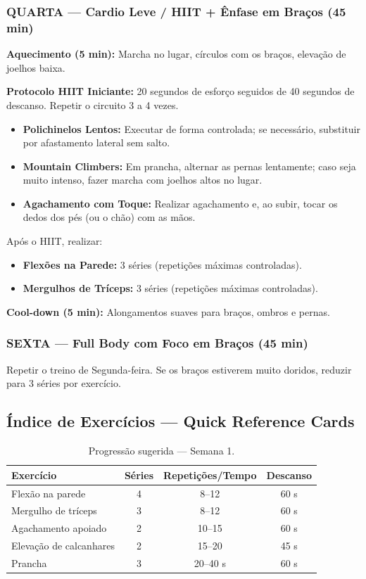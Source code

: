 \documentclass[12pt,a4paper]{scrartcl}
\begin{document}
\subsubsection{QUARTA — Cardio Leve / HIIT + Ênfase em Braços (45 min)}
\textbf{Aquecimento (5 min):} Marcha no lugar, círculos com os braços, elevação de joelhos baixa.

\textbf{Protocolo HIIT Iniciante:} 20 segundos de esforço seguidos de 40 segundos de descanso. Repetir o circuito 3 a 4 vezes.

\begin{itemize}
    \item \textbf{Polichinelos Lentos:} Executar de forma controlada; se necessário, substituir por afastamento lateral sem salto.
    \item \textbf{Mountain Climbers:} Em prancha, alternar as pernas lentamente; caso seja muito intenso, fazer marcha com joelhos altos no lugar.
    \item \textbf{Agachamento com Toque:} Realizar agachamento e, ao subir, tocar os dedos dos pés (ou o chão) com as mãos.
\end{itemize}
Após o HIIT, realizar:
\begin{itemize}
    \item \textbf{Flexões na Parede:} 3 séries (repetições máximas controladas).
    \item \textbf{Mergulhos de Tríceps:} 3 séries (repetições máximas controladas).
\end{itemize}
\textbf{Cool-down (5 min):} Alongamentos suaves para braços, ombros e pernas.

\subsubsection{SEXTA — Full Body com Foco em Braços (45 min)}
Repetir o treino de Segunda-feira. Se os braços estiverem muito doridos, reduzir para 3 séries por exercício.

\subsection{Índice de Exercícios — Quick Reference Cards}
\begin{table}[h]
\centering
\begin{tabular}{lccc}
\toprule
\textbf{Exercício} & \textbf{Séries} & \textbf{Repetições/Tempo} & \textbf{Descanso} \\
\midrule
Flexão na parede & 4 & 8–12 & 60 s \\
Mergulho de tríceps & 3 & 8–12 & 60 s \\
Agachamento apoiado & 2 & 10–15 & 60 s \\
Elevação de calcanhares & 2 & 15–20 & 45 s \\
Prancha & 3 & 20–40 s & 60 s \\
\bottomrule
\end{tabular}
\caption{Progressão sugerida — Semana 1.}
\end{table}
\end{document}
